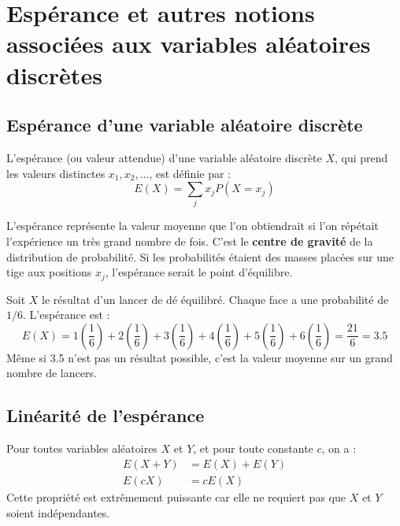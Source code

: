 \newpage
\section{Espérance et autres notions associées aux variables aléatoires discrètes }

\subsection{Espérance d'une variable aléatoire discrète}

\begin{definitionbox}[Espérance]
L'espérance (ou valeur attendue) d'une variable aléatoire discrète $X$, qui prend les valeurs distinctes $x_1, x_2, \dots$, est définie par :
$$ E(X) = \sum_j x_j P(X=x_j) $$
\end{definitionbox}

\begin{intuitionbox}
L'espérance représente la valeur moyenne que l'on obtiendrait si l'on répétait l'expérience un très grand nombre de fois. C'est le \textbf{centre de gravité} de la distribution de probabilité. Si les probabilités étaient des masses placées sur une tige aux positions $x_j$, l'espérance serait le point d'équilibre.
\end{intuitionbox}

\begin{examplebox}[Lancer d'un dé]
Soit $X$ le résultat d'un lancer de dé équilibré. Chaque face a une probabilité de $1/6$. L'espérance est :
$$ E(X) = 1\left(\frac{1}{6}\right) + 2\left(\frac{1}{6}\right) + 3\left(\frac{1}{6}\right) + 4\left(\frac{1}{6}\right) + 5\left(\frac{1}{6}\right) + 6\left(\frac{1}{6}\right) = \frac{21}{6} = 3.5 $$
Même si 3.5 n'est pas un résultat possible, c'est la valeur moyenne sur un grand nombre de lancers.
\end{examplebox}

\subsection{Linéarité de l'espérance}

\begin{theorembox}
Pour toutes variables aléatoires $X$ et $Y$, et pour toute constante $c$, on a :
\begin{align*}
E(X+Y) &= E(X) + E(Y) \\
E(cX) &= cE(X)
\end{align*}
Cette propriété est extrêmement puissante car elle ne requiert pas que $X$ et $Y$ soient indépendantes.
\end{theorembox}

